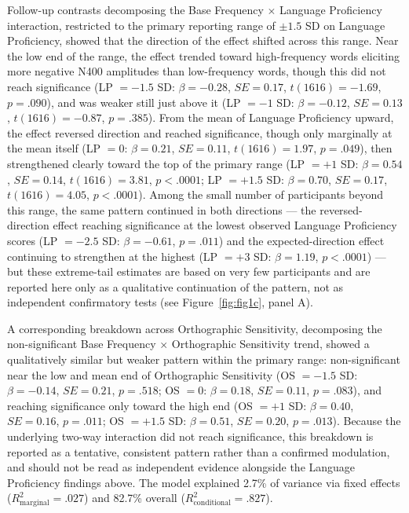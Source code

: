 \documentclass[utf8]{FrontiersinHarvard} %
\begin{document}
	Follow-up contrasts decomposing the Base Frequency $\times$ Language Proficiency interaction, restricted to the primary reporting range of $\pm 1.5$ SD on Language Proficiency, showed that the direction of the effect shifted across this range. Near the low end of the range, the effect trended toward high-frequency words eliciting more negative N400 amplitudes than low-frequency words, though this did not reach significance (LP $= -1.5$ SD: $\beta = -0.28$, $SE = 0.17$, $t(1616) = -1.69$, $p = .090$), and was weaker still just above it (LP $= -1$ SD: $\beta = -0.12$, $SE = 0.13$, $t(1616) = -0.87$, $p = .385$). From the mean of Language Proficiency upward, the effect reversed direction and reached significance, though only marginally at the mean itself (LP $= 0$: $\beta = 0.21$, $SE = 0.11$, $t(1616) = 1.97$, $p = .049$), then strengthened clearly toward the top of the primary range (LP $= +1$ SD: $\beta = 0.54$, $SE = 0.14$, $t(1616) = 3.81$, $p < .0001$; LP $= +1.5$ SD: $\beta = 0.70$, $SE = 0.17$, $t(1616) = 4.05$, $p < .0001$). Among the small number of participants beyond this range, the same pattern continued in both directions --- the reversed-direction effect reaching significance at the lowest observed Language Proficiency scores (LP $= -2.5$ SD: $\beta = -0.61$, $p = .011$) and the expected-direction effect continuing to strengthen at the highest (LP $= +3$ SD: $\beta = 1.19$, $p < .0001$) --- but these extreme-tail estimates are based on very few participants and are reported here only as a qualitative continuation of the pattern, not as independent confirmatory tests (see Figure~\ref{fig:fig1c}, panel A).

	A corresponding breakdown across Orthographic Sensitivity, decomposing the non-significant Base Frequency $\times$ Orthographic Sensitivity trend, showed a qualitatively similar but weaker pattern within the primary range: non-significant near the low and mean end of Orthographic Sensitivity (OS $= -1.5$ SD: $\beta = -0.14$, $SE = 0.21$, $p = .518$; OS $= 0$: $\beta = 0.18$, $SE = 0.11$, $p = .083$), and reaching significance only toward the high end (OS $= +1$ SD: $\beta = 0.40$, $SE = 0.16$, $p = .011$; OS $= +1.5$ SD: $\beta = 0.51$, $SE = 0.20$, $p = .013$). Because the underlying two-way interaction did not reach significance, this breakdown is reported as a tentative, consistent pattern rather than a confirmed modulation, and should not be read as independent evidence alongside the Language Proficiency findings above. The model explained 2.7\% of variance via fixed effects ($R^2_{\mathrm{marginal}} = .027$) and 82.7\% overall ($R^2_{\mathrm{conditional}} = .827$).
\end{document}
